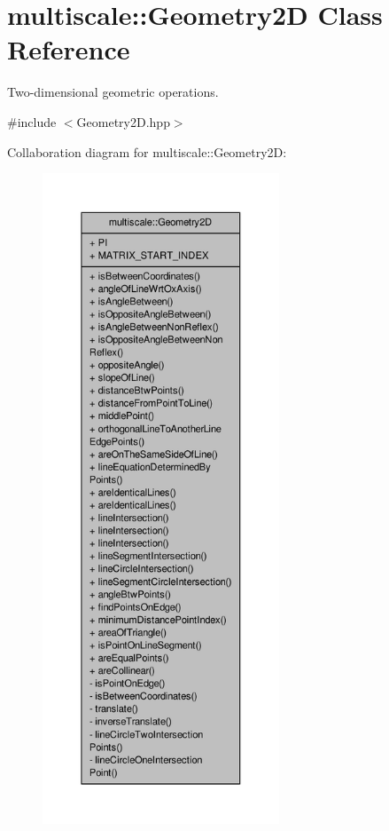 \hypertarget{classmultiscale_1_1Geometry2D}{\section{multiscale\-:\-:Geometry2\-D Class Reference}
\label{classmultiscale_1_1Geometry2D}
}


Two-\/dimensional geometric operations.  




{\ttfamily \#include $<$Geometry2\-D.\-hpp$>$}



Collaboration diagram for multiscale\-:\-:Geometry2\-D\-:
\nopagebreak
\begin{figure}[H]
\begin{center}
\leavevmode
\includegraphics[height=550pt]{classmultiscale_1_1Geometry2D__coll__graph}
\end{center}
\end{figure}

